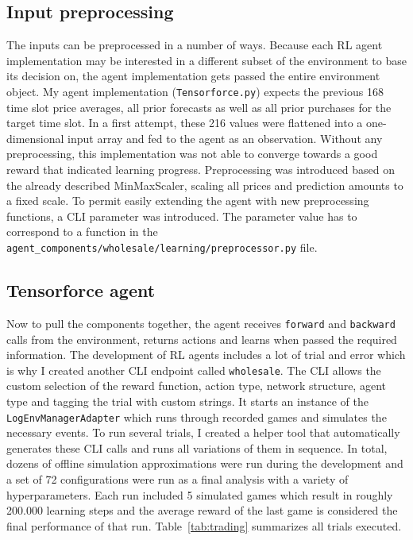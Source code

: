 \subsection{Input preprocessing}%
\label{sub:input_preprocessing}

The inputs can be preprocessed in a number of ways. Because each \ac{RL} agent implementation may be interested in a
different subset of the environment to base its decision on, the agent implementation gets passed the entire environment
object. 
My agent implementation (\texttt{Tensorforce.py})
expects the previous 168 time slot price averages, all prior forecasts as well as all prior purchases for the
target time slot. In a first attempt, these 216 values were flattened into a one-dimensional input array and fed
to the agent as an observation. Without any preprocessing, this implementation was not able to converge towards a good
reward that indicated learning progress. Preprocessing was introduced based on the already described MinMaxScaler,
scaling all prices and prediction amounts to a fixed scale. To permit easily extending the agent with new preprocessing
functions, a CLI parameter was introduced. The parameter value has to correspond to a function in the
\texttt{agent\_components/wholesale/learning/preprocessor.py} file. 

\subsection{Tensorforce agent}%
\label{sub:tensorforce_agent}

Now to pull the components together, the agent receives \texttt{forward} and \texttt{backward} calls from
the environment, returns actions and learns when passed the required information. The development of \ac{RL} agents
includes a lot of trial and error which is why I created another \ac{CLI} endpoint called \texttt{wholesale}. The
\ac{CLI} allows the custom selection of the reward function, action type, network structure, agent type and tagging the
trial with custom strings. It starts an instance of the \texttt{LogEnvManagerAdapter} which runs through recorded
games and simulates the necessary events. To run several trials, I created a helper tool that automatically generates
these CLI calls and runs all variations of them in sequence. In total, dozens of offline simulation approximations were
run during the development and a set of 72 configurations were run as a final analysis with a variety of
hyperparameters. Each run included 5 simulated games which result in roughly 200.000 learning steps and the average
reward of the last game is considered the final performance of that run. Table~\ref{tab:trading} summarizes all trials
executed. 

